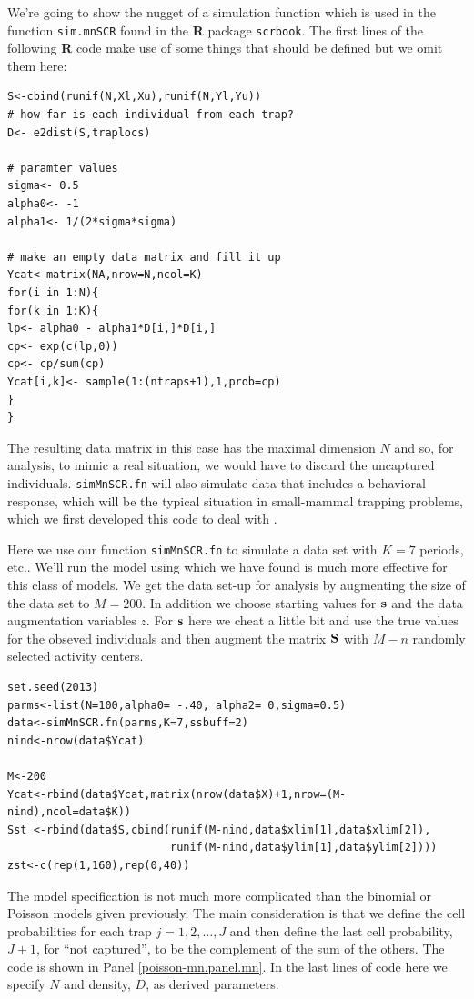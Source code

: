 We're going to show the nugget of a simulation function which is
used in the function \mbox{\tt sim.mnSCR} found in the {\bf R} package
\mbox{\tt scrbook}.  The first lines of the following {\bf R} code
make use of some things that should be defined but we omit them here:
{\small
\begin{verbatim}
S<-cbind(runif(N,Xl,Xu),runif(N,Yl,Yu))
# how far is each individual from each trap?
D<- e2dist(S,traplocs)

# paramter values
sigma<- 0.5
alpha0<- -1
alpha1<- 1/(2*sigma*sigma)

# make an empty data matrix and fill it up
Ycat<-matrix(NA,nrow=N,ncol=K)
for(i in 1:N){
for(k in 1:K){
lp<- alpha0 - alpha1*D[i,]*D[i,]
cp<- exp(c(lp,0))
cp<- cp/sum(cp)
Ycat[i,k]<- sample(1:(ntraps+1),1,prob=cp)
}
}
\end{verbatim}
}
The resulting data matrix in this case has the maximal dimension $N$
and so, for analysis, to mimic a real situation, we would have to
discard the uncaptured individuals.  \mbox{\tt simMnSCR.fn} will also
simulate data that includes a behavioral response, which will be the
typical situation in small-mammal trapping problems, which we first
developed this code to deal with \citep[see][for
details]{converse_royle:2012}.

Here we use our function \mbox{\tt simMnSCR.fn} to simulate a data set
with $K=7$ periods, etc.. We'll run the model using \jags which 
we have found is much more effective for this class of models.  We get
the data set-up for analysis by augmenting the size of the data set to
$M=200$. In addition we choose starting values for ${\bf s}$ and the
data augmentation variables $z$.  For ${\bf s}$ here we cheat a little
bit and use the true values for the obseved individuals and then
augment the matrix ${\bf S}$ with $M-n$ randomly selected activity
centers.

{\small 
\begin{verbatim}
set.seed(2013)
parms<-list(N=100,alpha0= -.40, alpha2= 0,sigma=0.5)
data<-simMnSCR.fn(parms,K=7,ssbuff=2)
nind<-nrow(data$Ycat)

M<-200
Ycat<-rbind(data$Ycat,matrix(nrow(data$X)+1,nrow=(M-nind),ncol=data$K))
Sst <-rbind(data$S,cbind(runif(M-nind,data$xlim[1],data$xlim[2]),
                         runif(M-nind,data$ylim[1],data$ylim[2])))
zst<-c(rep(1,160),rep(0,40))
\end{verbatim}
}

The model specification is not much more complicated than the binomial
or Poisson models given previously. The main consideration is that we
define the cell probabilities for each trap $j=1,2,\dots,J$ and then
define the last cell probability, $J+1$, for ``not captured'', to be
the complement of the sum of the others. The code is shown in Panel
\ref{poisson-mn.panel.mn}.  In the last lines of code here we specify
$N$ and density, $D$, as derived parameters.

